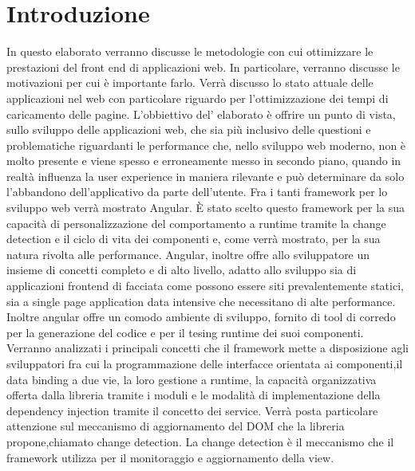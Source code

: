 \chapter*{Introduzione}
In questo elaborato verranno discusse le metodologie con cui ottimizzare le prestazioni del front end di applicazioni web.
In particolare, verranno discusse le motivazioni per cui è importante farlo. Verrà discusso lo stato attuale delle applicazioni nel web con particolare riguardo per l'ottimizzazione dei tempi di caricamento delle pagine.
\newline
L'obbiettivo del' elaborato è offrire un punto di vista, sullo sviluppo delle applicazioni web, che sia più inclusivo delle questioni e problematiche riguardanti le performance che, nello sviluppo web moderno, non è molto presente e viene spesso e erroneamente messo in secondo piano, quando in realtà influenza la user experience in maniera rilevante e può determinare da solo l'abbandono dell'applicativo da parte dell'utente.
\newline
Fra i tanti framework per lo sviluppo web verrà mostrato Angular. È stato scelto questo framework per la sua capacità di personalizzazione del comportamento a runtime tramite la change detection e il ciclo di vita dei componenti e, come verrà mostrato, per la sua natura rivolta alle performance.
\newline
Angular, inoltre offre allo sviluppatore un insieme di concetti completo e di alto livello, adatto allo sviluppo sia di applicazioni frontend di facciata come possono essere siti prevalentemente statici, sia a single page application data intensive che necessitano di alte performance. Inoltre angular offre un comodo ambiente di sviluppo, fornito di tool di corredo per la generazione del codice e per il tesing runtime dei suoi componenti.
\newline
Verranno analizzati i principali concetti che il framework mette a disposizione agli sviluppatori fra cui la programmazione delle interfacce orientata ai componenti,il data binding a due vie, la loro gestione a runtime, la capacità organizzativa offerta dalla libreria tramite i moduli e le modalità di implementazione della dependency injection tramite il concetto dei service.
\newline
Verrà posta particolare attenzione sul meccanismo di aggiornamento del DOM che la libreria propone,chiamato change detection.
La change detection è il meccanismo che il framework utilizza per il monitoraggio e aggiornamento della view.

